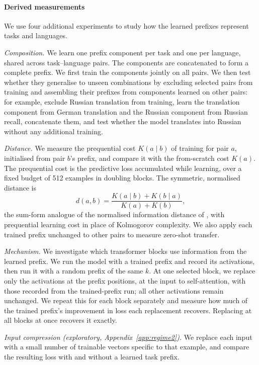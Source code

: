 \documentclass{article}
\begin{document}
\paragraph{Derived measurements}
We use four additional experiments to study how the learned prefixes represent tasks and languages.

\emph{Composition.} We learn one prefix component per task and one per language, shared across task--language pairs. The components are concatenated to form a complete prefix. We first train the components jointly on all pairs. We then test whether they generalise to unseen combinations by excluding selected pairs from training and assembling their prefixes from components learned on other pairs: for example, exclude Russian translation from training, learn the translation component from German translation and the Russian component from Russian recall, concatenate them, and test whether the model translates into Russian without any additional training.

\emph{Distance.} We measure the prequential cost $K(a\mid b)$ of training for pair $a$, initialised from pair $b$'s prefix, and compare it with the from-scratch cost $K(a)$. The prequential cost is the predictive loss accumulated while learning, over a fixed budget of 512 examples in doubling blocks. The symmetric, normalised distance is
\[
d(a,b)=\frac{K(a\mid b)+K(b\mid a)}{K(a)+K(b)},
\]
the sum-form analogue of the normalised information distance of \citet{li2004similarity}, with prequential learning cost in place of Kolmogorov complexity. We also apply each trained prefix unchanged to other pairs to measure zero-shot transfer.

\emph{Mechanism.} We investigate which transformer blocks use information from the learned prefix. We run the model with a trained prefix and record its activations, then run it with a random prefix of the same $k$. At one selected block, we replace only the activations at the prefix positions, at the input to self-attention, with those recorded from the trained-prefix run; all other activations remain unchanged. We repeat this for each block separately and measure how much of the trained prefix's improvement in loss each replacement recovers. Replacing at all blocks at once recovers it exactly.

\emph{Input compression (exploratory, Appendix~\ref{app:regime2}).} We replace each input with a small number of trainable vectors specific to that example, and compare the resulting loss with and without a learned task prefix.
\end{document}
